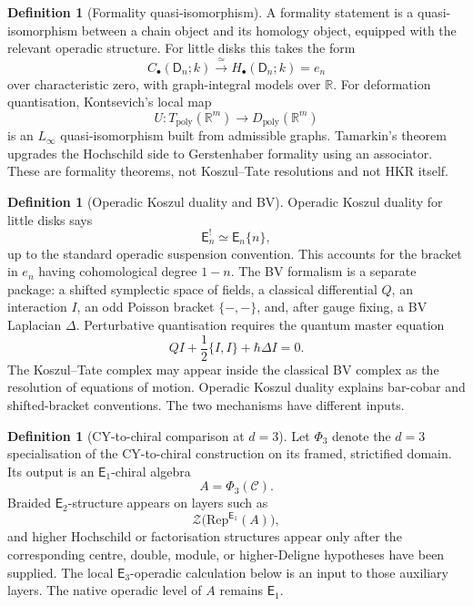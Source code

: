 \documentclass[11pt]{amsart}
\theoremstyle{definition}
\newtheorem{definition}[theorem]{Definition}
\theoremstyle{remark}
\providecommand{\En}{\mathsf{E}_n}
\providecommand{\Eone}{\mathsf{E}_1}
\providecommand{\Etwo}{\mathsf{E}_2}
\providecommand{\Ethree}{\mathsf{E}_3}
\providecommand{\cC}{\mathcal{C}}
\providecommand{\cZ}{\mathcal{Z}}
\providecommand{\RR}{\mathbb{R}}
\providecommand{\Tpoly}{T_{\mathrm{poly}}}
\providecommand{\Dpoly}{D_{\mathrm{poly}}}
\providecommand{\Rep}{\mathrm{Rep}}
\begin{document}
\begin{definition}[Formality quasi-isomorphism]
\label{def:formality}
A formality statement is a quasi-isomorphism between a chain object and
its homology object, equipped with the relevant operadic structure.
For little disks this takes the form
\[
  C_\bullet(\mathsf{D}_n;k)\xrightarrow{\;\simeq\;}
  H_\bullet(\mathsf{D}_n;k)=e_n
\]
over characteristic zero, with graph-integral models over \(\RR\).
For deformation quantisation, Kontsevich's local map
\[
  U\colon \Tpoly(\RR^m)\longrightarrow \Dpoly(\RR^m)
\]
is an \(L_\infty\) quasi-isomorphism built from admissible graphs.
Tamarkin's theorem upgrades the Hochschild side to Gerstenhaber
formality using an associator.  These are formality theorems, not
Koszul--Tate resolutions and not HKR itself.
\end{definition}

\begin{definition}[Operadic Koszul duality and BV]
\label{def:operadic-bv}
Operadic Koszul duality for little disks says
\[
  \En^{!}\simeq \En\{n\},
\]
up to the standard operadic suspension convention.  This accounts for
the bracket in \(e_n\) having cohomological degree \(1-n\).
The BV formalism is a separate package: a shifted symplectic space of
fields, a classical differential \(Q\), an interaction \(I\), an odd
Poisson bracket \(\{-,-\}\), and, after gauge fixing, a BV Laplacian
\(\Delta\).  Perturbative quantisation requires the quantum master
equation
\[
  QI+\frac12\{I,I\}+\hbar\Delta I=0.
\]
The Koszul--Tate complex may appear inside the classical BV complex as
the resolution of equations of motion.  Operadic Koszul duality explains
bar-cobar and shifted-bracket conventions.  The two mechanisms have
different inputs.
\end{definition}

\begin{definition}[CY-to-chiral comparison at \(d=3\)]
\label{def:cy-to-chiral-d3}
Let \(\Phi_3\) denote the \(d=3\) specialisation of the CY-to-chiral
construction on its framed, strictified domain.  Its output is an
\(\Eone\)-chiral algebra
\[
  A=\Phi_3(\cC).
\]
Braided \(\Etwo\)-structure appears on layers such as
\[
  \cZ\bigl(\Rep^{\Eone}(A)\bigr),
\]
and higher Hochschild or factorisation structures appear only after the
corresponding centre, double, module, or higher-Deligne hypotheses have
been supplied.  The local \(\Ethree\)-operadic calculation below is an
input to those auxiliary layers.  The native operadic level of \(A\)
remains \(\Eone\).
\end{definition}
\end{document}
